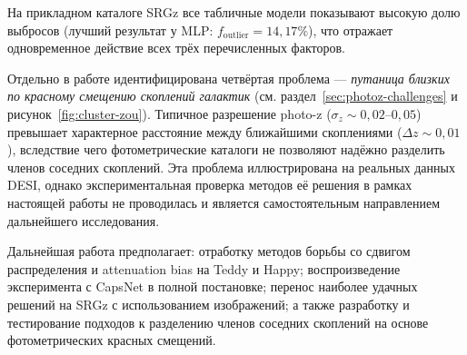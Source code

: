 \documentclass[12pt,a4paper]{article}
\begin{document}
На прикладном каталоге SRGz все табличные модели показывают высокую долю выбросов (лучший результат у MLP: $f_{\mathrm{outlier}} = 14{,}17\%$), что отражает одновременное действие всех трёх перечисленных факторов.

Отдельно в работе идентифицирована четвёртая проблема — \emph{путаница близких по красному смещению скоплений галактик} (см. раздел~\ref{sec:photoz-challenges} и рисунок~\ref{fig:cluster-zou}). Типичное разрешение photo-z ($\sigma_z \sim 0{,}02$–$0{,}05$) превышает характерное расстояние между ближайшими скоплениями ($\Delta z \sim 0{,}01$), вследствие чего фотометрические каталоги не позволяют надёжно разделить членов соседних скоплений. Эта проблема иллюстрирована на реальных данных DESI, однако экспериментальная проверка методов её решения в рамках настоящей работы не проводилась и является самостоятельным направлением дальнейшего исследования.

Дальнейшая работа предполагает: отработку методов борьбы со сдвигом распределения и attenuation bias на Teddy и Happy; воспроизведение эксперимента с CapsNet в полной постановке; перенос наиболее удачных решений на SRGz с использованием изображений; а также разработку и тестирование подходов к разделению членов соседних скоплений на основе фотометрических красных смещений.
\end{document}
